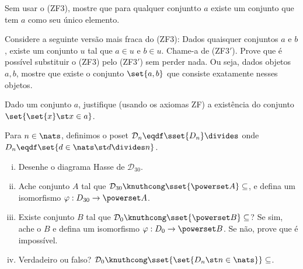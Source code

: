 \begin{exercise}
	Sem usar o (ZF3), mostre que para qualquer conjuntto $a$ existe um conjunto que tem $a$ como seu único elemento.
\end{exercise}

\begin{exercise}
	Considere a seguinte versão mais fraca do (ZF3):
	\newline
	\newline Dados quaisquer conjuntos $a$ e $b$, existe um conjunto $u$ tal que $a \in u$ e $b \in u$.
	\newline
	\newline Chame-a de (ZF3$'$). Prove que é possível substituir o (ZF3) pelo (ZF3$'$) sem perder nada. Ou seja, dados objetos $a, b$, mostre que existe o conjunto $\set {a, b}$ que consiste exatamente nesses objetos.
\end{exercise}

\begin{exercise}
	Dado um conjunto $a$, justifique (usando os axiomas ZF) a existência do conjunto $\set {\set {x} \st x \in a}$.
\end{exercise}

\begin{exercise}
	Para $n \in \nats$, definimos o poset $\mathcal{D}_n \eqdf \sset {D_n} \divides$ onde $D_n \eqdf \set {d \in \nats \st d \divides n}$.
	\begin{enumerate}[(i)]
		\item Desenhe o diagrama Hasse de $\mathcal{D}_{30}$.
		\item Ache conjunto $A$ tal que $\mathcal{D}_{30} \knuthcong \sset {\powerset A} \subseteq$, e defina um isomorfismo $\varphi : D_{30} \to \powerset A$.
		\item Existe conjunto $B$ tal que $\mathcal{D}_0 \knuthcong \sset {\powerset B} \subseteq$? Se sim, ache o $B$ e defina um isomorfismo $\varphi : D_0 \to \powerset B$. Se não, prove que é impossível.
		\item Verdadeiro ou falso? $\mathcal{D}_0 \knuthcong \sset {\set {D_n \st n \in \nats}} \subseteq$.
	\end{enumerate}
\end{exercise}
